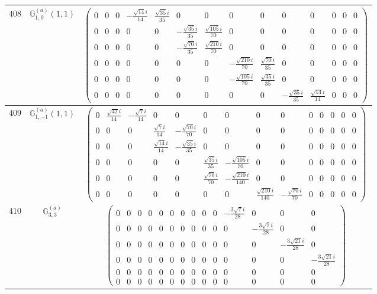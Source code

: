\documentclass[fleqn,8pt,landscape]{jsarticle}
\begin{document}
\begin{center}
\begin{longtable}{ccc}
$ 408 $ & $ \mathbb{G}_{1,0}^{(a)}(1,1) $ & $ \begin{pmatrix} 0 & 0 & 0 & - \frac{\sqrt{14} i}{14} & \frac{\sqrt{35} i}{35} & 0 & 0 & 0 & 0 & 0 & 0 & 0 & 0 & 0 \\ 0 & 0 & 0 & 0 & 0 & - \frac{\sqrt{35} i}{35} & \frac{\sqrt{105} i}{70} & 0 & 0 & 0 & 0 & 0 & 0 & 0 \\ 0 & 0 & 0 & 0 & 0 & - \frac{\sqrt{70} i}{35} & \frac{\sqrt{210} i}{70} & 0 & 0 & 0 & 0 & 0 & 0 & 0 \\ 0 & 0 & 0 & 0 & 0 & 0 & 0 & - \frac{\sqrt{210} i}{70} & \frac{\sqrt{70} i}{35} & 0 & 0 & 0 & 0 & 0 \\ 0 & 0 & 0 & 0 & 0 & 0 & 0 & - \frac{\sqrt{105} i}{70} & \frac{\sqrt{35} i}{35} & 0 & 0 & 0 & 0 & 0 \\ 0 & 0 & 0 & 0 & 0 & 0 & 0 & 0 & 0 & - \frac{\sqrt{35} i}{35} & \frac{\sqrt{14} i}{14} & 0 & 0 & 0 \end{pmatrix} $ \\ \hline
$ 409 $ & $ \mathbb{G}_{1,-1}^{(a)}(1,1) $ & $ \begin{pmatrix} 0 & \frac{\sqrt{42} i}{14} & - \frac{\sqrt{7} i}{14} & 0 & 0 & 0 & 0 & 0 & 0 & 0 & 0 & 0 & 0 & 0 \\ 0 & 0 & 0 & \frac{\sqrt{7} i}{14} & - \frac{\sqrt{70} i}{70} & 0 & 0 & 0 & 0 & 0 & 0 & 0 & 0 & 0 \\ 0 & 0 & 0 & \frac{\sqrt{14} i}{14} & - \frac{\sqrt{35} i}{35} & 0 & 0 & 0 & 0 & 0 & 0 & 0 & 0 & 0 \\ 0 & 0 & 0 & 0 & 0 & \frac{\sqrt{35} i}{35} & - \frac{\sqrt{105} i}{70} & 0 & 0 & 0 & 0 & 0 & 0 & 0 \\ 0 & 0 & 0 & 0 & 0 & \frac{\sqrt{70} i}{70} & - \frac{\sqrt{210} i}{140} & 0 & 0 & 0 & 0 & 0 & 0 & 0 \\ 0 & 0 & 0 & 0 & 0 & 0 & 0 & \frac{\sqrt{210} i}{140} & - \frac{\sqrt{70} i}{70} & 0 & 0 & 0 & 0 & 0 \end{pmatrix} $ \\ \hline
$ 410 $ & $ \mathbb{G}_{3,3}^{(a)} $ & $ \begin{pmatrix} 0 & 0 & 0 & 0 & 0 & 0 & 0 & 0 & 0 & 0 & - \frac{3 \sqrt{7} i}{28} & 0 & 0 & 0 \\ 0 & 0 & 0 & 0 & 0 & 0 & 0 & 0 & 0 & 0 & 0 & - \frac{3 \sqrt{7} i}{28} & 0 & 0 \\ 0 & 0 & 0 & 0 & 0 & 0 & 0 & 0 & 0 & 0 & 0 & 0 & - \frac{3 \sqrt{21} i}{28} & 0 \\ 0 & 0 & 0 & 0 & 0 & 0 & 0 & 0 & 0 & 0 & 0 & 0 & 0 & - \frac{3 \sqrt{21} i}{28} \\ 0 & 0 & 0 & 0 & 0 & 0 & 0 & 0 & 0 & 0 & 0 & 0 & 0 & 0 \\ 0 & 0 & 0 & 0 & 0 & 0 & 0 & 0 & 0 & 0 & 0 & 0 & 0 & 0 \end{pmatrix} $ \\ \hline

\end{longtable}
\end{center}
\end{document}
